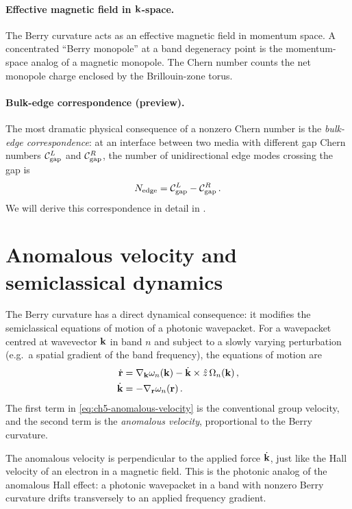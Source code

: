 \paragraph{Effective magnetic field in $\mathbf{k}$-space.}
The Berry curvature acts as an effective magnetic field in momentum
space.  A concentrated ``Berry monopole'' at a band degeneracy point is
the momentum-space analog of a magnetic monopole.  The Chern number
counts the net monopole charge enclosed by the Brillouin-zone torus.

\paragraph{Bulk-edge correspondence (preview).}
The most dramatic physical consequence of a nonzero Chern number is the
\emph{bulk-edge correspondence}: at an interface between two media with
different gap Chern numbers $\mathcal{C}_{\mathrm{gap}}^L$ and
$\mathcal{C}_{\mathrm{gap}}^R$, the number of unidirectional edge modes
crossing the gap is
\begin{equation}\label{eq:ch5-bulk-edge}
  N_{\mathrm{edge}} = \mathcal{C}_{\mathrm{gap}}^L - \mathcal{C}_{\mathrm{gap}}^R\,.
\end{equation}
We will derive this correspondence in detail in .

\section{Anomalous velocity and semiclassical dynamics}
\label{sec:ch5-anomalous-velocity}

The Berry curvature has a direct dynamical consequence: it modifies
the semiclassical equations of motion of a photonic wavepacket.
For a wavepacket centred at wavevector $\mathbf{k}$ in band $n$ and
subject to a slowly varying perturbation (e.g.\ a spatial gradient of
the band frequency), the equations of motion are
\cite{ozawa2018topological}
\begin{align}
  \dot{\mathbf{r}} &= \nabla_{\mathbf{k}}\omega_n(\mathbf{k})
  - \dot{\mathbf{k}}\times\hat{z}\,\Omega_n(\mathbf{k})\,,
  \label{eq:ch5-anomalous-velocity}\\
  \dot{\mathbf{k}} &= -\nabla_{\mathbf{r}}\omega_n(\mathbf{r})\,.
  \label{eq:ch5-force}
\end{align}
The first term in \eqref{eq:ch5-anomalous-velocity} is the
conventional group velocity, and the second term is the
\emph{anomalous velocity}, proportional to the Berry curvature.

The anomalous velocity is perpendicular to the applied force
$\dot{\mathbf{k}}$, just like the Hall velocity of an electron in a
magnetic field.  This is the photonic analog of the anomalous Hall
effect: a photonic wavepacket in a band with nonzero Berry curvature
drifts transversely to an applied frequency gradient.


